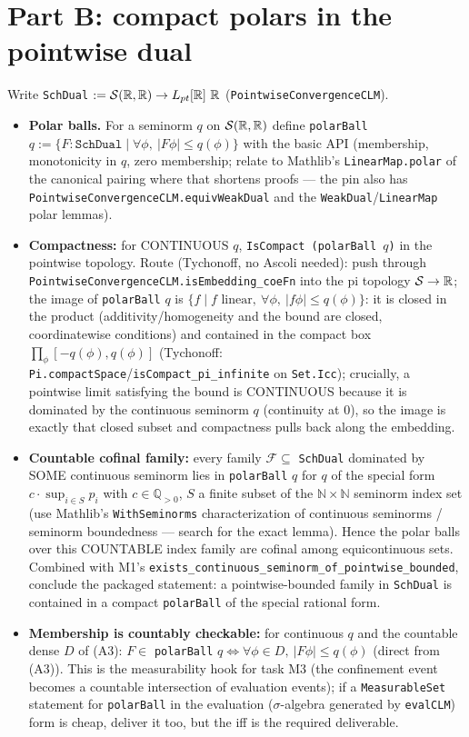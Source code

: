 \documentclass[11pt]{article}
\theoremstyle{plain}
\theoremstyle{remark}
\begin{document}
\section*{Part B: compact polars in the pointwise dual}

Write \texttt{SchDual} $:=\mathcal{S}(\mathbb{R},\mathbb{R})\to L_{pt}[\mathbb{R}]\ \mathbb{R}$
(\texttt{PointwiseConvergenceCLM}).
\begin{itemize}
\item[(B1)] \textbf{Polar balls.} For a seminorm $q$ on $\mathcal{S}(\mathbb{R},\mathbb{R})$
define \texttt{polarBall} $q:=\{F:\texttt{SchDual}\mid\forall\phi,\
|F\phi|\le q(\phi)\}$ with the basic API (membership, monotonicity in $q$,
zero membership; relate to Mathlib's \texttt{LinearMap.polar} of the
canonical pairing where that shortens proofs --- the pin also has
\texttt{PointwiseConvergenceCLM.equivWeakDual} and the
\texttt{WeakDual}/\texttt{LinearMap} polar lemmas).
\item[(B2)] \textbf{Compactness:} for CONTINUOUS $q$,
\texttt{IsCompact (polarBall $q$)} in the pointwise topology. Route
(Tychonoff, no Ascoli needed): push through
\texttt{PointwiseConvergenceCLM.isEmbedding\_coeFn} into the pi topology
$\mathcal{S}\to\mathbb{R}$; the image of \texttt{polarBall} $q$ is
$\{f\mid f\text{ linear},\ \forall\phi,\ |f\phi|\le q(\phi)\}$: it is closed
in the product (additivity/homogeneity and the bound are closed,
coordinatewise conditions) and contained in the compact box
$\prod_\phi[-q(\phi),q(\phi)]$ (Tychonoff:
\texttt{Pi.compactSpace}/\texttt{isCompact\_pi\_infinite} on
\texttt{Set.Icc}); crucially, a pointwise limit satisfying the bound is
CONTINUOUS because it is dominated by the continuous seminorm $q$
(continuity at $0$), so the image is exactly that closed subset and
compactness pulls back along the embedding.
\item[(B3)] \textbf{Countable cofinal family:} every family
$\mathcal F\subseteq$ \texttt{SchDual} dominated by SOME continuous
seminorm lies in \texttt{polarBall} $q$ for $q$ of the special form
$c\cdot\sup_{i\in S}p_i$ with $c\in\mathbb Q_{>0}$, $S$ a finite subset of
the $\mathbb N\times\mathbb N$ seminorm index set (use Mathlib's
\texttt{WithSeminorms} characterization of continuous seminorms /
seminorm boundedness --- search for the exact lemma). Hence the polar
balls over this COUNTABLE index family are cofinal among equicontinuous
sets. Combined with M1's
\texttt{exists\_continuous\_seminorm\_of\_pointwise\_bounded}, conclude the
packaged statement: a pointwise-bounded family in \texttt{SchDual} is
contained in a compact \texttt{polarBall} of the special rational form.
\item[(B4)] \textbf{Membership is countably checkable:} for continuous
$q$ and the countable dense $D$ of (A3):
$F\in$ \texttt{polarBall} $q\iff\forall\phi\in D,\ |F\phi|\le q(\phi)$
(direct from (A3)). This is the measurability hook for task M3 (the
confinement event becomes a countable intersection of evaluation events);
if a \texttt{MeasurableSet} statement for \texttt{polarBall} in the
evaluation ($\sigma$-algebra generated by \texttt{evalCLM}) form is cheap,
deliver it too, but the iff is the required deliverable.
\end{itemize}
\end{document}
